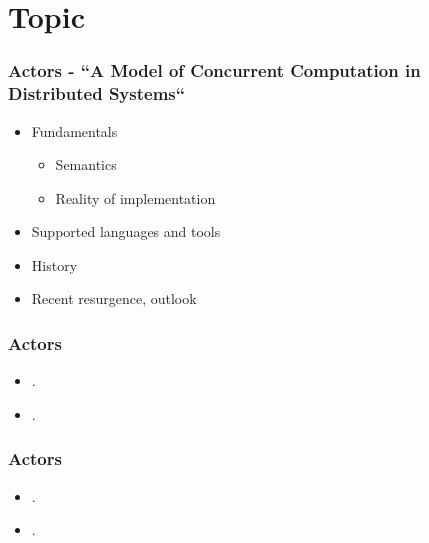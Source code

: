 \section{Topic}
\begin{frame}
\frametitle{Actors - ``A Model of Concurrent Computation in Distributed Systems``}
\begin{itemize}
\item Fundamentals
	\begin{itemize}
	\item Semantics
	\item Reality of implementation
	\end{itemize}
\item Supported languages and tools
\item History
\item Recent resurgence, outlook
\end{itemize}
\end{frame}

\begin{frame}
\frametitle{Actors}
\begin{itemize}
\item .
\item .
\end{itemize}
\end{frame}

\begin{frame}
\frametitle{Actors}
\begin{itemize}
\item .
\item .
\end{itemize}
\end{frame}